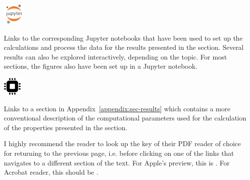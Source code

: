 \begin{refsection}
\vspace{1em}
\begin{minipage}{0.09\textwidth}
\includegraphics[width=3em]{figures/jupyter.png}
\end{minipage}
\begin{minipage}{0.9\textwidth}
Links to the corresponding Jupyter notebooks that have been used to set up the calculations and process the data for the results presented in the section. Several results can also be explored interactively, depending on the topic. For most sections, the figures also have been set up in a Jupyter notebook.
\end{minipage}

\vspace{1em}
\begin{minipage}{0.09\textwidth}
\includegraphics[width=2.5em]{figures/silicon.png}
\end{minipage}
\begin{minipage}{0.9\textwidth}
Links to a section in Appendix~\ref{appendix:sec-results} which contains a more conventional description of the computational parameters used for the calculation of the properties presented in the section.
\end{minipage}

\vspace{1em}
I highly recommend the reader to look up the key of their PDF reader of choice for returning to the previous page, i.e. before clicking on one of the links that navigates to a different section of the text. For Apple's preview, this is \code{Cmd+[}. For Acrobat reader, this should be . 




\end{refsection}
